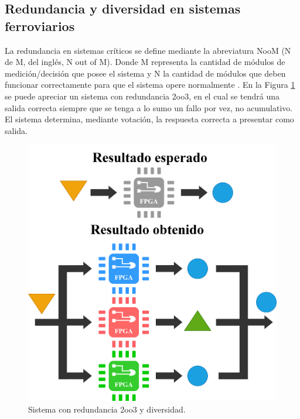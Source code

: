 \subsection{Redundancia y diversidad en sistemas ferroviarios}

	La redundancia en sistemas críticos se define mediante la abreviatura NooM (N de M, del inglés, N out of M). Donde M representa la cantidad de módulos de medición/decisión que posee el sistema y N la cantidad de módulos que deben funcionar correctamente para que el sistema opere normalmente \cite{Paper_12,Paper_41,Paper_47,Paper_78,Paper_80,Paper_82,Paper_84}. En la Figura \ref{fig:redundancia} se puede apreciar un sistema con redundancia 2oo3, en el cual se tendrá una salida correcta siempre que se tenga a lo sumo un fallo por vez, no acumulativo. El sistema determina, mediante votación, la respuesta correcta a presentar como salida.
	
	\begin{figure}[H]
		\centering
		\includegraphics[width=1\textwidth]{Figuras/redundancia.png}
		\centering\caption{Sistema con redundancia 2oo3 y diversidad.}
		\label{fig:redundancia}
	\end{figure}
	
